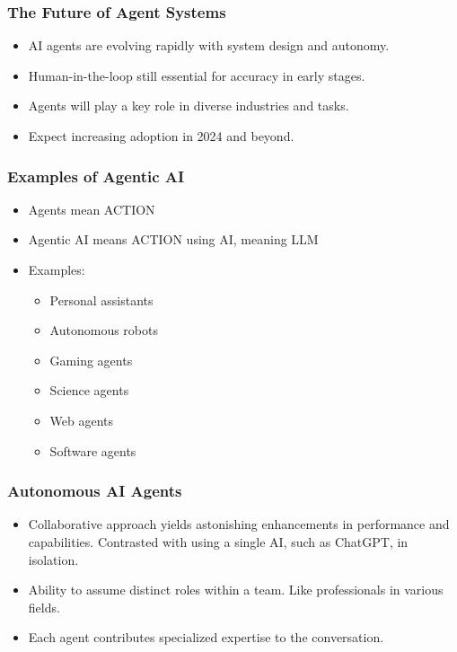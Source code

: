 \begin{frame}[fragile]\frametitle{The Future of Agent Systems}
    \begin{itemize}
        \item AI agents are evolving rapidly with system design and autonomy.
        \item Human-in-the-loop still essential for accuracy in early stages.
        \item Agents will play a key role in diverse industries and tasks.
        \item Expect increasing adoption in 2024 and beyond.
    \end{itemize}
\end{frame}


\begin{frame}[fragile]\frametitle{Examples of Agentic AI}
  \begin{itemize}
  \item Agents mean ACTION
  \item Agentic AI means ACTION using AI, meaning LLM
  \item Examples:
  \begin{itemize}
    \item Personal assistants
    \item Autonomous robots
    \item Gaming agents
    \item Science agents
    \item Web agents
    \item Software agents
  \end{itemize}
    \end{itemize}

\end{frame}


\begin{frame}[fragile]\frametitle{Autonomous AI Agents}
  \begin{itemize}
    \item Collaborative approach yields astonishing enhancements in performance and capabilities. Contrasted with using a single AI, such as ChatGPT, in isolation.
    \item Ability to assume distinct roles within a team. Like professionals in various fields.
    \item Each agent contributes specialized expertise to the conversation.
  \end{itemize}
\end{frame}

